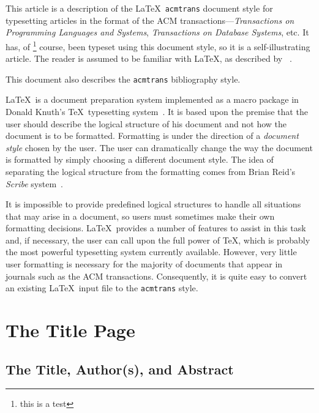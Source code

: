 This article is a description of the \LaTeX\ {\tt acmtrans} document
style for typesetting articles in the format of the ACM
transactions---{\em Transactions on Programming Languages and
Systems}, {\em Transactions on Database Systems}, etc.  It has, of
\footnote{this is a test}
course, been typeset using this document style, so it is a
self-illustrating article.  The reader is assumed to be familiar
with \LaTeX, as described by ~.

This document also describes the {\tt acmtrans} bibliography style.

\LaTeX\ is a document preparation system
implemented as a macro package in Donald Knuth's
\TeX\ typesetting system~.  It is based
upon the premise that the user should describe the logical structure of
his document and not how the document is to be formatted.  Formatting
is under the direction of a {\em document style} chosen by the user.
The user can dramatically change the way the document is formatted by
simply choosing a different document style.  The idea of separating the
logical structure from the formatting comes from Brian Reid's {\em
Scribe\/} system~.  

It is impossible to provide predefined logical structures to handle all
situations that may arise in a document, so users must sometimes make
their own formatting decisions.  \LaTeX\ provides a number of features
to assist in this task and, if necessary, the user can call upon the
full power of \TeX, which is probably the most powerful typesetting
system currently available.  However, very little user formatting is
necessary for the majority of documents that appear in journals such as
the ACM transactions.  Consequently, it is quite easy to convert
an existing \LaTeX\ input file to the {\tt acmtrans} style.

\section{The Title Page}

\subsection{The Title, Author(s), and Abstract}

